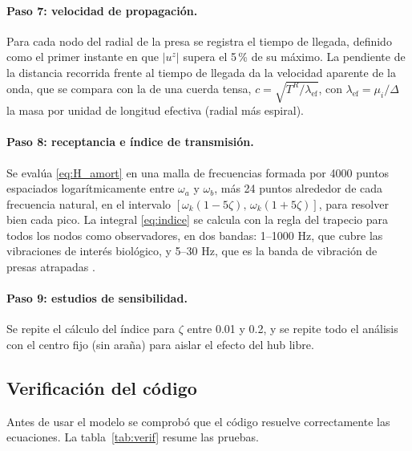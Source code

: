 \documentclass[11pt,letterpaper]{article}
\begin{document}
\paragraph{Paso 7: velocidad de propagación.} Para cada nodo del radial de
la presa se registra el tiempo de llegada, definido como el primer instante
en que $|u^z|$ supera el 5\,\% de su máximo. La pendiente de la distancia
recorrida frente al tiempo de llegada da la velocidad aparente de la onda,
que se compara con la de una cuerda tensa,
$c=\sqrt{T^R/\lambda_{\text{ef}}}$, con $\lambda_{\text{ef}}=\mu_i/\Delta$
la masa por unidad de longitud efectiva (radial más espiral).

\paragraph{Paso 8: receptancia e índice de transmisión.} Se evalúa
\eqref{eq:H_amort} en una malla de frecuencias formada por 4000 puntos
espaciados logarítmicamente entre $\omega_a$ y $\omega_b$, más 24 puntos
alrededor de cada frecuencia natural, en el intervalo
$[\omega_k(1-5\zeta),\,\omega_k(1+5\zeta)]$, para resolver bien cada pico. La
integral \eqref{eq:indice} se calcula con la regla del trapecio para todos
los nodos como observadores, en dos bandas: 1--1000 Hz, que cubre las
vibraciones de interés biológico, y 5--30 Hz, que es la banda de vibración de
presas atrapadas \cite{landolfa1996}.

\paragraph{Paso 9: estudios de sensibilidad.} Se repite el cálculo del
índice para $\zeta$ entre 0.01 y 0.2, y se repite todo el análisis con el
centro fijo (sin araña) para aislar el efecto del hub libre.

\subsection{Verificación del código}

Antes de usar el modelo se comprobó que el código resuelve correctamente las
ecuaciones. La tabla~\ref{tab:verif} resume las pruebas.
\end{document}

